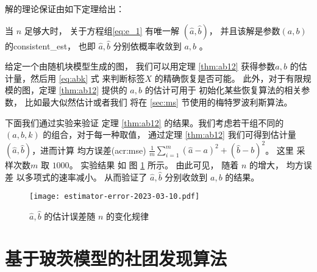解的理论保证由如下定理给出：
\begin{theorem}\label{thm:ab12}
当 $n$ 足够大时，
关于方程组\eqref{eq:e_1}
有唯一解 $(\hat{a}, \hat{b})$，
并且该解是参数$(a,b)$的\gls{consistent_est}，
也即 $\hat{a}, \hat{b}$ 
分别依概率收敛到 $a,b$ 。
\end{theorem}
给定一个由随机块模型生成的图，
我们可以用定理 \ref{thm:ab12} 获得参数$a,b$ 
的估计量，然后用 \eqref{eq:abk}
式
来判断标签$X$ 的精确恢复是否可能。
此外，对于有限规模的图，定理 \ref{thm:ab12} 提供的 $a,b$ 的估计可用于
初始化某些恢复算法的相关参数，
比如最大似然估计或者我们
将在 \ref{sec:ms} 节使用的梅特罗波利斯算法。

下面我们通过实验来验证
定理 \ref{thm:ab12} 的结果。我们考虑若干组不同的
$(a,b,k)$ 的组合，对于每一种取值，
通过定理 \ref{thm:ab12} 我们可得到估计量
$(\hat{a}, \hat{b})$，进而计算
均方误差(\gls{acr:mse})
$\frac{1}{m} \sum_{i=1}^m (\hat{a}-a)^2 + (\hat{b}-b)^2$。
这里  采样次数$m$ 取 $1000$。
实验结果 如
图 \ref{fig:estimator} 所示。
由此可见， 随着 $n$ 的增大，
均方误差 以多项式的速率减小。
从而验证了 $\hat{a}, \hat{b}$ 分别收敛到 $a,b$ 
的结果。

\begin{figure}[ht!]
	\centering
		\texttt{[image: estimator-error-2023-03-10.pdf]}
		\caption{ $\hat{a}, \hat{b}$ 的估计误差随
		$n$ 的变化规律 }\label{fig:estimator}
\end{figure}

\section{基于玻茨模型的社团发现算法}\label{sec:potts}
